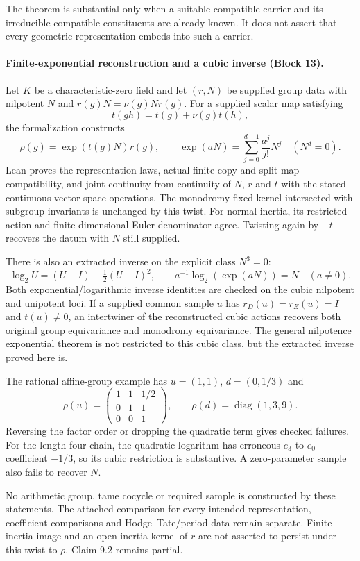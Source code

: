 \documentclass[11pt]{article}
\theoremstyle{definition}
\theoremstyle{remark}
\begin{document}
The theorem is substantial only when a suitable compatible carrier and its irreducible compatible constituents are already known.  It does not assert that every geometric representation embeds into such a carrier.


\paragraph{Finite-exponential reconstruction and a cubic inverse (Block 13).}
Let $K$ be a characteristic-zero field and let $(r,N)$ be supplied group data
with nilpotent $N$ and $r(g)N=\nu(g)Nr(g)$. For a supplied scalar map satisfying
\[
t(gh)=t(g)+\nu(g)t(h),
\]
the formalization constructs
\[
\rho(g)=\exp(t(g)N)r(g),\qquad
\exp(aN)=\sum_{j=0}^{d-1}\frac{a^j}{j!}N^j\quad(N^d=0).
\]
Lean proves the representation laws, actual finite-copy and split-map
compatibility, and joint continuity from continuity of $N$, $r$ and $t$ with
the stated continuous vector-space operations. The monodromy fixed kernel
intersected with subgroup invariants is unchanged by this twist. For normal
inertia, its restricted action and finite-dimensional Euler denominator agree.
Twisting again by $-t$ recovers the datum with $N$ still supplied.

There is also an extracted inverse on the explicit class $N^3=0$:
\[
\log_2 U=(U-I)-\tfrac12(U-I)^2,\qquad
 a^{-1}\log_2(\exp(aN))=N\quad(a\ne0).
\]
Both exponential/logarithmic inverse identities are checked on the cubic
nilpotent and unipotent loci. If a supplied common sample $u$ has
$r_D(u)=r_E(u)=I$ and $t(u)\ne0$, an intertwiner of the reconstructed cubic
actions recovers both original group equivariance and monodromy equivariance.
The general nilpotence exponential theorem is not restricted to this cubic
class, but the extracted inverse proved here is.

The rational affine-group example has $u=(1,1)$, $d=(0,1/3)$ and
\[
\rho(u)=\begin{pmatrix}1&1&1/2\\0&1&1\\0&0&1\end{pmatrix},
\qquad \rho(d)=\operatorname{diag}(1,3,9).
\]
Reversing the factor order or dropping the quadratic term gives checked
failures. For the length-four chain, the quadratic logarithm has erroneous
$e_3$-to-$e_0$ coefficient $-1/3$, so its cubic restriction is substantive.
A zero-parameter sample also fails to recover $N$.

No arithmetic group, tame cocycle or required sample is constructed by these
statements. The attached comparison for every intended representation,
coefficient comparisons and Hodge--Tate/period data remain separate. Finite
inertia image and an open inertia kernel of $r$ are not asserted to persist
under this twist to $\rho$. Claim 9.2 remains partial.
\end{document}
